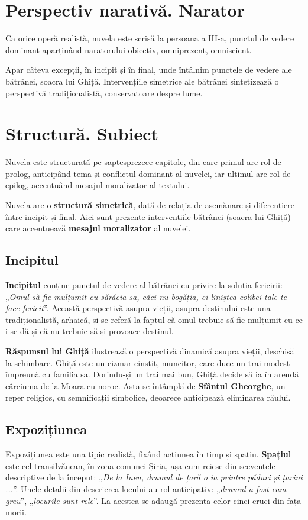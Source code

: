 \documentclass{article}
\newcommand{\qu}[1]{„\emph{#1}”}
\begin{document}
\section{Perspectiv narativă. Narator}
Ca orice operă realistă, nuvela este scrisă la persoana a III-a, punctul de vedere dominant aparținând naratorului obiectiv, omniprezent, omniscient.

Apar câteva excepții, în incipit și în final, unde întâlnim punctele de vedere ale bătrânei, soacra lui Ghiță. Intervențiile simetrice ale bătrânei sintetizează o perspectivă tradiționalistă, conservatoare despre lume.
\section{Structură. Subiect}
Nuvela este structurată pe șaptesprezece capitole, din care primul are rol de prolog, anticipând tema și conflictul dominant al nuvelei, iar ultimul are rol de epilog, accentuând mesajul moralizator al textului.

Nuvela are o \textbf{structură simetrică}, dată de relația de asemănare și diferențiere între incipit și final. Aici sunt prezente intervențiile bătrânei (soacra lui Ghiță) care accentuează \textbf{mesajul moralizator} al nuvelei.

\subsection{Incipitul}
\textbf{Incipitul} conține punctul de vedere al bătrânei cu privire la soluția fericirii: \qu{Omul să fie mulțumit cu sărăcia sa, căci nu bogăția, ci liniștea colibei tale te face fericit}. Această perspectivă asupra vieții, asupra destinului este una tradiționalistă, arhaică, și se referă la faptul că omul trebuie să fie mulțumit cu ce i se dă și că nu trebuie să-și provoace destinul.

\textbf{Răspunsul lui Ghiță} ilustrează o perspectivă dinamică asupra vieții, deschisă la schimbare. Ghiță este un cizmar cinstit, muncitor, care duce un trai modest împreună cu familia sa. Dorindu-și un trai mai bun, Ghiță decide să ia în arendă cârciuma de la Moara cu noroc. Asta se întâmplă de \textbf{Sfântul Gheorghe}, un reper religios, cu semnificații simbolice, deoarece anticipează eliminarea răului.

\subsection{Expozițiunea}
Expozițiunea este una tipic realistă, fixând acțiunea în timp și spațiu. \textbf{Spațiul} este cel transilvănean, în zona comunei Șiria, așa cum reiese din secvențele descriptive de la început: \qu{De la Ineu, drumul de țară o ia printre păduri și țarini ...}. Unele detalii din descrierea locului au rol anticipativ: \qu{drumul a fost cam greu}, \qu{locurile sunt rele}. La acestea se adaugă prezența celor cinci cruci din fața morii.
\end{document}

